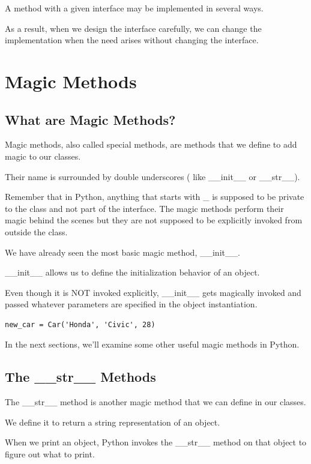 \documentclass{article}
\begin{document}
A method with a given interface may be implemented in several ways.

As a result, when we design the interface carefully, we can change the implementation when the need arises without changing the interface.

\section{Magic Methods}
\subsection{What are Magic Methods?}

Magic methods, also called special methods, are methods that we define to add magic to our classes. 

Their name is surrounded by double underscores ( like {\_}{\_}init{\_}{\_} or {\_}{\_}str{\_}{\_}).

Remember that in Python, anything that starts with {\_} is supposed to be private to the class and not part of the interface. The magic methods perform their magic behind the scenes but they are not supposed to be explicitly invoked from outside the class.

We have already seen the most basic magic method, {\_}{\_}init{\_}{\_}. 

{\_}{\_}init{\_}{\_} allows us to define  the initialization behavior of an object.

Even though it is NOT invoked explicitly, {\_}{\_}init{\_}{\_} gets magically invoked and passed whatever parameters are specified in the object instantiation.

\begin{lstlisting}
new_car = Car('Honda', 'Civic', 28)
\end{lstlisting}

In the next sections,  we'll examine some other useful magic methods in Python.

\subsection{The {\_}{\_}str{\_}{\_} Methods}

The {\_}{\_}str{\_}{\_} method is another magic method that we can define in our classes.

We define it to return a string representation of an object.  

When we print an object, Python invokes the {\_}{\_}str{\_}{\_} method on that object to figure out what to print.
\end{document}
